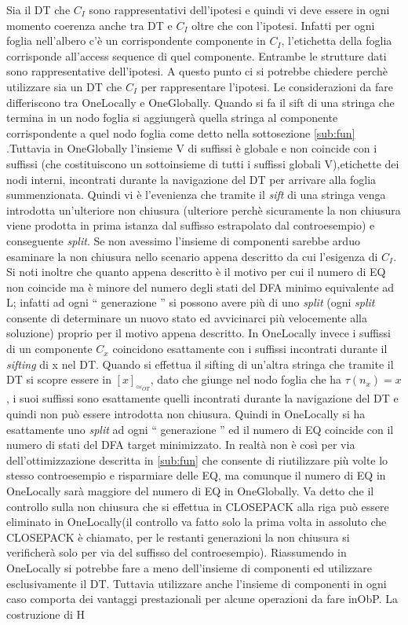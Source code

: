 Sia il \ac{DT} che $C_I$ sono rappresentativi dell'ipotesi e quindi vi deve essere in ogni momento coerenza anche tra \ac{DT} e $C_I$ oltre che con l'ipotesi. Infatti per ogni foglia nell'albero c'è un corrispondente componente  in $C_I$, l'etichetta della foglia corrisponde all'access sequence di quel componente. Entrambe le strutture dati sono rappresentative dell'ipotesi.
A questo punto ci si potrebbe chiedere perchè utilizzare sia un \ac{DT} che $C_I$ per rappresentare l'ipotesi. Le considerazioni da fare differiscono tra OneLocally e OneGlobally. Quando si fa il sift di una stringa che termina in un nodo foglia si aggiungerà quella stringa al componente corrispondente a quel nodo foglia come detto nella sottosezione \ref{sub:fun} .Tuttavia in OneGlobally l'insieme V di suffissi è globale e non coincide con i suffissi (che costituiscono un sottoinsieme di tutti i suffissi globali V),etichette dei nodi interni, incontrati durante la navigazione del \ac{DT} per arrivare alla foglia summenzionata. Quindi vi è l'evenienza che tramite il \textit{sift} di una stringa venga introdotta un'ulteriore non chiusura (ulteriore perchè sicuramente la non chiusura viene prodotta in prima istanza dal suffisso estrapolato dal controesempio) e conseguente \textit{split}. Se non avessimo l'insieme di componenti sarebbe arduo esaminare la non chiusura nello scenario appena descritto da cui l'esigenza di $C_I$. Si noti inoltre che quanto appena descritto è il motivo per cui il numero di \ac{EQ} non coincide ma è minore del numero degli stati del \ac{DFA}  minimo equivalente ad \ac{L}; infatti ad ogni `` generazione  '' si possono avere più di uno \textit{split} (ogni \textit{split} consente di determinare un nuovo stato ed avvicinarci più velocemente alla soluzione) proprio per il motivo appena descritto. In OneLocally invece i suffissi di un componente $C_{x}$ coincidono esattamente con i suffissi incontrati durante il \textit{sifting} di x nel \ac{DT}. Quando si effettua il sifting di un'altra stringa che tramite il \ac{DT} si scopre essere in $[x]_{\simeq_{OT}}$, dato che giunge nel nodo foglia che ha $\tau(n_{x}) = x$, i suoi suffissi sono esattamente quelli incontrati durante la navigazione del \ac{DT} e quindi non può essere introdotta non chiusura. Quindi in OneLocally si ha esattamente uno \textit{split} ad ogni `` generazione  '' ed il numero di \ac{EQ} coincide con il numero di stati del DFA target minimizzato. In realtà non è così per via dell'ottimizzazione descritta in \ref{sub:fun} che consente di riutilizzare più volte lo stesso controesempio e risparmiare delle \ac{EQ}, ma comunque il numero di \ac{EQ} in OneLocally sarà maggiore del numero di \ac{EQ} in OneGlobally. Va detto che il controllo sulla non chiusura che si effettua in CLOSEPACK alla riga  può essere eliminato in OneLocally(il controllo va fatto solo la prima volta in assoluto che CLOSEPACK è chiamato, per le restanti generazioni la non chiusura si verificherà solo per via del suffisso del controesempio). Riassumendo in OneLocally si potrebbe fare a meno dell'insieme di componenti ed utilizzare esclusivamente il \ac{DT}. Tuttavia utilizzare anche l'insieme di componenti in ogni caso comporta dei vantaggi prestazionali per alcune operazioni da fare in\ac{ObP}. La costruzione di \ac{H} 